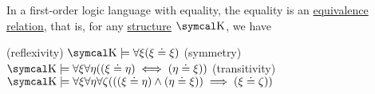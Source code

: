 \begin{proposition}\label{thm:first_order_equality_is_equivalence_relation}
  In a first-order logic language with equality, the equality is an \hyperref[def:equivalence_relation]{equivalence relation}, that is, for any \hyperref[def:first_order_structure]{structure} \( \CK \), we have
  \begin{PropEnum}
    (reflexivity) \( \CK \models \forall \xi (\xi \doteq \xi) \)
    (symmetry) \( \CK \models \forall \xi \forall \eta ((\xi \doteq \eta) \iff (\eta \doteq \xi)) \)
    (transitivity) \( \CK \models \forall \xi \forall \eta \forall \zeta (((\xi \doteq \eta) \wedge (\eta \doteq \xi)) \implies (\xi \doteq \zeta)) \)
  \end{PropEnum}
\end{proposition}
